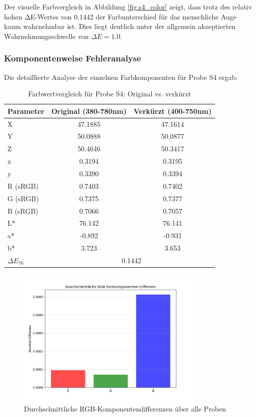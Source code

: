 Der visuelle Farbvergleich in Abbildung \ref{fig:s4_color} zeigt, dass trotz des relativ hohen ΔE-Wertes von 0.1442 der Farbunterschied für das menschliche Auge kaum wahrnehmbar ist. Dies liegt deutlich unter der allgemein akzeptierten Wahrnehmungsschwelle von $\Delta E = 1.0$.

\subsubsection{Komponentenweise Fehleranalyse}

Die detaillierte Analyse der einzelnen Farbkomponenten für Probe S4 ergab:

\begin{table}[htbp]
\centering
\caption{Farbwertvergleich für Probe S4: Original vs. verkürzt}
\begin{tabular}{lcc}
\hline
\textbf{Parameter} & \textbf{Original (380-780nm)} & \textbf{Verkürzt (400-750nm)} \\
\hline
X & 47.1885 & 47.1614 \\
Y & 50.0888 & 50.0877 \\
Z & 50.4646 & 50.3417 \\
x & 0.3194 & 0.3195 \\
y & 0.3390 & 0.3394 \\
R (sRGB) & 0.7403 & 0.7402 \\
G (sRGB) & 0.7375 & 0.7377 \\
B (sRGB) & 0.7066 & 0.7057 \\
L* & 76.142 & 76.141 \\
a* & -0.892 & -0.931 \\
b* & 3.723 & 3.653 \\
\hline
$\Delta E_{76}$ & \multicolumn{2}{c}{0.1442} \\
\hline
\end{tabular}
\label{tab:s4_comparison}
\end{table}

\begin{figure}[htbp]
    \centering
    \includegraphics[width=0.8\textwidth]{./figures/rgb_diff.png}
    \caption{Durchschnittliche RGB-Komponentendifferenzen über alle Proben}
    \label{fig:rgb_differences}
\end{figure}

